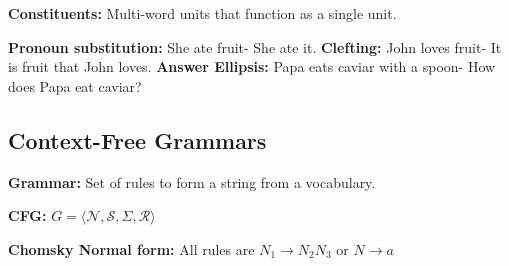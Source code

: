 \textbf{Constituents:} Multi-word units that function as a single unit.\\
\begin{comment}
	John speaks [spanish], [spanish and french]. \\
	$\text{[Fruit flies] [like [a green banana]] or Fruit [flies [like[a green banana]]]}$\\
	There can be large ambiguity in a sentence, mainly due to attachment of the preposition $[\text{in my pajamas}]$, or the modifier scope $\text{[plastic cup holder]}$.\\
\end{comment} 

\textbf{Pronoun substitution:} She ate fruit- She ate it. 
\textbf{Clefting:} John loves fruit- It is fruit that John loves.
\textbf{Answer Ellipsis:} Papa eats caviar with a spoon- How does Papa eat caviar?\\

\subsection{Context-Free Grammars}
\textbf{Grammar:} Set of rules to form a string from a vocabulary.\\
\begin{comment}
	There are terminal and not-terminal symbols. Nonterminal symbols can be exchanged with vocabulary tokens. 
	If there is more than one way of generating the same string, the grammar is said to be ambiguous.\\
\end{comment} 

\textbf{CFG:} $G = \langle \mathcal{N}, \mathcal{S}, \Sigma, \mathcal{R} \rangle$\\
\begin{comment}
	Non-terminal symbols, special start symbol, alphabet of terminals and production rules.\\
	Encodes a subset of $\Sigma^*$\\
\end{comment} 

\textbf{Chomsky Normal form:} All rules are $N_1 \rightarrow N_2N_3$ or $N \rightarrow a$\\
\begin{comment}
	We can represent string generation as tree, each node is a constituent, shows the syntactic structure and derivation under the grammar.
	For every context free grammar, we can find a grammar in CNF. For any grammar in CNF, we can find a grammar G' that accepts the same set of strings, maybe different trees though.
	There are about $O(4^N)$ many trees for a sentence in CNF.\\
\end{comment} 

